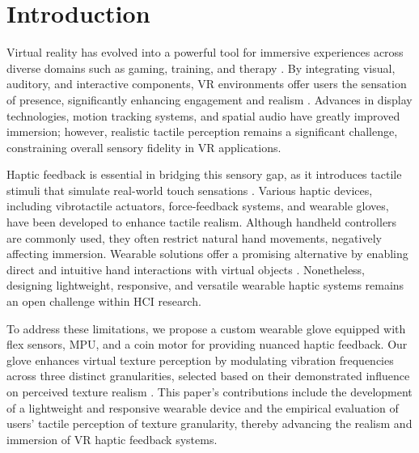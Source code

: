\documentclass[graybox]{svmult}
\begin{document}
\section{Introduction}
Virtual reality has evolved into a powerful tool for immersive experiences across diverse domains such as gaming, training, and therapy \cite{slater2016enhancing}. By integrating visual, auditory, and interactive components, VR environments offer users the sensation of presence, significantly enhancing engagement and realism \cite{biocca2013communication}. Advances in display technologies, motion tracking systems, and spatial audio have greatly improved immersion; however, realistic tactile perception remains a significant challenge, constraining overall sensory fidelity in VR applications.

Haptic feedback is essential in bridging this sensory gap, as it introduces tactile stimuli that simulate real-world touch sensations \cite{culbertson2018haptics}. Various haptic devices, including vibrotactile actuators, force-feedback systems, and wearable gloves, have been developed to enhance tactile realism. Although handheld controllers are commonly used, they often restrict natural hand movements, negatively affecting immersion. Wearable solutions offer a promising alternative by enabling direct and intuitive hand interactions with virtual objects \cite{pacchierotti2017wearable}. Nonetheless, designing lightweight, responsive, and versatile wearable haptic systems remains an open challenge within HCI research.

To address these limitations, we propose a custom wearable glove equipped with flex sensors, MPU, and a coin motor for providing nuanced haptic feedback. Our glove enhances virtual texture perception by modulating vibration frequencies across three distinct granularities, selected based on their demonstrated influence on perceived texture realism \cite{strohmeier2017generating,bensmaia2003vibrations}. This paper's contributions include the development of a lightweight and responsive wearable device and the empirical evaluation of users' tactile perception of texture granularity, thereby advancing the realism and immersion of VR haptic feedback systems.
\end{document}
